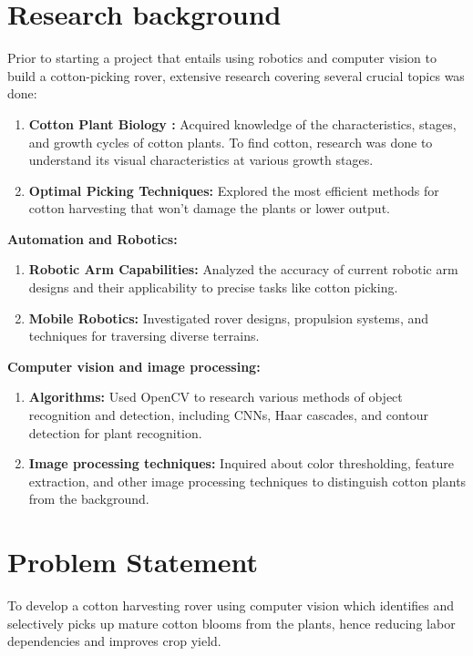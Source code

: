 \documentclass[12pt,a4paper]{report}
\begin{document}


\section {Research background}
\par Prior to starting a project that entails using robotics and computer vision to build a cotton-picking rover, extensive research covering several crucial topics was done:
\begin{enumerate}
   \item {\bf{ Cotton Plant Biology :}} \cite{r5}\cite{r4}Acquired knowledge of the characteristics, stages, and growth cycles of cotton plants. To find cotton, research was done to understand its visual characteristics at various growth stages.
   \item {\bf{ Optimal Picking Techniques:}} Explored the most efficient methods for cotton harvesting that won't damage the plants or lower output.
\end{enumerate}
{\bf{ Automation and Robotics:}}  
\begin{enumerate}
   \item {\bf{ Robotic Arm Capabilities:}} \cite{r13} Analyzed the accuracy of current robotic arm designs and their applicability to precise tasks like cotton picking.
   \item {\bf{ Mobile Robotics:}}  Investigated rover designs, propulsion systems, and techniques for traversing diverse terrains.
\end{enumerate}
{\bf{ Computer vision and image processing:}}
\begin{enumerate}
   \item {\bf{ Algorithms:}} \cite{r9}\cite{r10}Used OpenCV to research various methods of object recognition and detection, including CNNs, Haar cascades, and contour detection for plant recognition.
  \item {\bf{ Image processing techniques:}} \cite{r3}Inquired about color thresholding, feature extraction, and other image processing techniques to distinguish cotton plants from the background.
\end{enumerate}





\section {Problem Statement}
\par To develop a cotton harvesting rover using computer vision which identifies and
selectively picks up mature cotton blooms from the plants, hence reducing labor
dependencies and improves crop yield.
\end{document}
